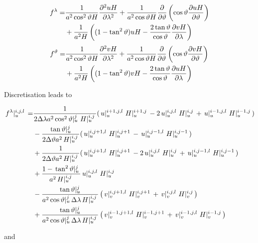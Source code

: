 \documentclass[a4paper]{article}
\begin{document}
\begin{equation}\begin{split}
  f^\lambda=&\frac1{a^2\cos^2\vartheta
    H}\frac{\partial^2 {uH}}{\partial {\lambda}^2}+\frac1{a^2\cos\vartheta H}\frac{\partial {}}{\partial {\vartheta}}\left(\cos\vartheta\frac{\partial {uH}}{\partial {\vartheta}}\right)\\
  &+\frac1{a^2H}\left((1-\tan^2\vartheta)uH-\frac{2\tan\vartheta}{\cos\vartheta}\frac{\partial {vH}}{\partial {\lambda}}\right)
\end{split}\end{equation}
\begin{equation}\begin{split}
  f^\vartheta=&\frac1{a^2\cos^2\vartheta
    H}\frac{\partial^2 {vH}}{\partial {\lambda}^2}+\frac1{a^2\cos\vartheta H}\frac{\partial {}}{\partial {\vartheta}}\left(\cos\vartheta\frac{\partial {vH}}{\partial {\vartheta}}\right)\\
  &+\frac1{a^2H}\left((1-\tan^2\vartheta)vH-\frac{2\tan\vartheta}{\cos\vartheta}\frac{\partial {uH}}{\partial {\lambda}}\right)
\end{split}\end{equation}

Discretisation leads to

\begin{equation}
  \begin{split}
    \,{f^\lambda}\vert_{u}^{{i},{j},{l}}\, =&
    \frac1{2\Delta\lambda a^2\,{\cos^2\vartheta}\vert_{u}^{{j}}\,\,{H}\vert_{u}^{{i},{j}}\,}(\,{u}\vert_{u}^{{i+1},{j},{l}}\,\,{H}\vert_{u}^{{i+1},{j}}\,-2\,{u}\vert_{u}^{{i},{j},{l}}\,\,{H}\vert_{u}^{{i},{j}}\,+\,{u}\vert_{u}^{{i-1},{j},{l}}\,\,{H}\vert_{u}^{{i-1},{j}}\,)\\
    &-\frac{\,{\tan\vartheta}\vert_{u}^{{j}}\,}{2\Delta\vartheta a^2\,{H}\vert_{u}^{{i},{j}}\,}(\,{u}\vert_{u}^{{i},{j+1},{l}}\,\,{H}\vert_{u}^{{i},{j+1}}\,-\,{u}\vert_{u}^{{i},{j-1},{l}}\,\,{H}\vert_{u}^{{i},{j-1}}\,)\\
    &+\frac1{2\Delta\vartheta a^2\,{H}\vert_{u}^{{i},{j}}\,}(\,{u}\vert_{u}^{{i},{j+1},{l}}\,\,{H}\vert_{u}^{{i},{j+1}}\,-2\,{u}\vert_{u}^{{i},{j},{l}}\,\,{H}\vert_{u}^{{i},{j}}\,+\,{u}\vert_{u}^{{i},{j-1},{l}}\,\,{H}\vert_{u}^{{i},{j-1}}\,)\\
    &+\frac{1-\,{\tan^2\vartheta}\vert_{u}^{{j}}\,}{a^2\,{H}\vert_{u}^{{i},{j}}\,}\,{u}\vert_{u}^{{i},{j},{l}}\,\,{H}\vert_{u}^{{i},{j}}\,\\
    &-\frac{\,{\tan\vartheta}\vert_{u}^{{j}}\,}{a^2\,{\cos\vartheta}\vert_{u}^{{j}}\,\Delta\lambda\,{H}\vert_{u}^{{i},{j}}\,}\left(\,{v}\vert_{v}^{{i},{j+1},{l}}\,\,{H}\vert_{v}^{{i},{j+1}}\,+\,{v}\vert_{v}^{{i},{j},{l}}\,\,{H}\vert_{v}^{{i},{j}}\,\right)\\
    &+\frac{\,{\tan\vartheta}\vert_{u}^{{j}}\,}{a^2\,{\cos\vartheta}\vert_{u}^{{j}}\,\Delta\lambda\,{H}\vert_{u}^{{i},{j}}\,}\left(\,{v}\vert_{v}^{{i-1},{j+1},{l}}\,\,{H}\vert_{v}^{{i-1},{j+1}}\,+\,{v}\vert_{v}^{{i-1},{j},{l}}\,\,{H}\vert_{v}^{{i-1},{j}}\,\right)
  \end{split}
\end{equation}

and
\end{document}
